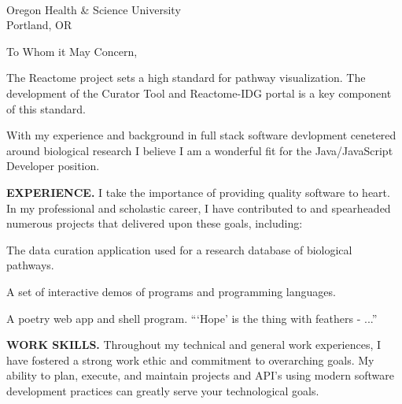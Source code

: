 



\textcolor{my-grey}{\dotfill}
\bigbreak

{\DTMtoday}\\
Oregon Health \& Science University\\
Portland, OR

\vspace*{2\baselineskip}

To Whom it May Concern,

\vspace*{\baselineskip}

The Reactome project sets a high standard for pathway visualization. The development of the Curator Tool and Reactome-IDG portal is a key component of this standard.

\vspace*{\baselineskip}

With my experience and background in full stack software devlopment cenetered around biological research I believe I am a wonderful fit for the Java/JavaScript Developer position.

\vspace*{\baselineskip}

\textbf{EXPERIENCE.} I take the importance of providing quality software to heart. In my professional and scholastic career, I have contributed to and spearheaded numerous projects that delivered upon these goals, including:

\begin{itemize}[label=$\triangleright$]
The data curation application used for a research database of biological pathways.

A set of interactive demos of programs and programming languages.

A poetry web app and shell program. ```Hope' is the thing with feathers - ...''

\end{itemize}

\vspace*{\baselineskip}

\textbf{WORK SKILLS.} Throughout my technical and general work experiences, I have fostered a strong work ethic and commitment to overarching goals. My ability to plan, execute, and maintain projects and API's using modern software development practices can greatly serve your technological goals.

